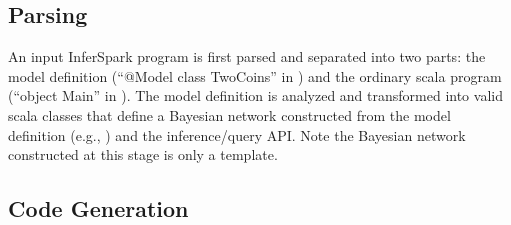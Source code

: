 \subsection{Parsing}
An input InferSpark program is first parsed and separated into two parts:
the model definition (``{\sf @Model} class TwoCoins'' in
) and
the ordinary scala program (``{\sf object Main}'' in
). The model definition is analyzed and
transformed into valid scala classes that define a Bayesian
network constructed from the model definition
(e.g., ) and the inference/query API.
Note the Bayesian network
constructed at this stage is only a template.


\subsection{Code Generation}


